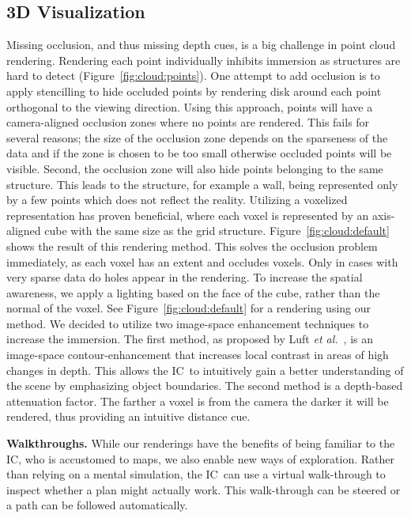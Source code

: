 \documentclass[conference,10pt,letter]{IEEEtran}
\def\IC{IC}
\def\etal{\textit{et al.}}
\begin{document}
\subsection{3D Visualization} \label{sec:overview:3dvisualization}
 Missing occlusion, and thus missing depth cues, is a big challenge in point cloud rendering. Rendering each point individually inhibits immersion as structures are hard to detect (Figure~\ref{fig:cloud:points}). One attempt to add occlusion is to apply stencilling to hide occluded points by rendering disk around each point orthogonal to the viewing direction. Using this approach, points will have a camera-aligned occlusion zones where no points are rendered. This fails for several reasons; the size of the occlusion zone depends on the sparseness of the data and if the zone is chosen to be too small otherwise occluded points will be visible. Second, the occlusion zone will also hide points belonging to the same structure. This leads to the structure, for example a wall, being represented only by a few points which does not reflect the reality. Utilizing a voxelized representation has proven beneficial, where each voxel is represented by an axis-aligned cube with the same size as the grid structure. Figure~\ref{fig:cloud:default} shows the result of this rendering method. This solves the occlusion problem immediately, as each voxel has an extent and occludes voxels. Only in cases with very sparse data do holes appear in the rendering. To increase the spatial awareness, we apply a lighting based on the face of the cube, rather than the normal of the voxel. See Figure~\ref{fig:cloud:default} for a rendering using our method. We decided to utilize two image-space enhancement techniques to increase the immersion. The first method, as proposed by Luft \etal~\cite{Luft06imageenhancement}, is an image-space contour-enhancement that increases local contrast in areas of high changes in depth. This allows the \IC\ to intuitively gain a better understanding of the scene by emphasizing object boundaries. The second method is a depth-based attenuation factor. The farther a voxel is from the camera the darker it will be rendered, thus providing an intuitive distance cue.

\noindent \textbf{Walkthroughs.} While our renderings have the benefits of being familiar to the \IC , who is accustomed to maps, we also enable new ways of exploration. Rather than relying on a mental simulation, the \IC\ can use a virtual walk-through to inspect whether a plan might actually work. This walk-through can be steered or a path can be followed automatically.
\end{document}
